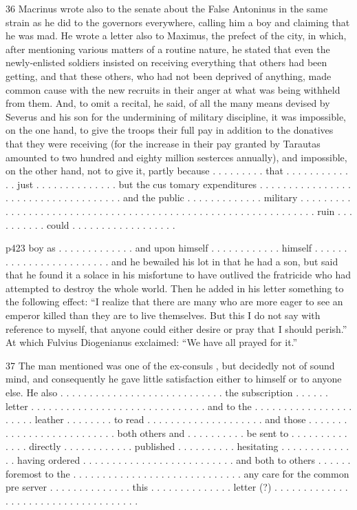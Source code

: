 36
Macrinus wrote also to the senate about the False Antoninus in the same strain as he did to the governors everywhere, calling him a boy and claiming that he was mad. He wrote a letter also to Maximus, the prefect of the city, in which, after mentioning various matters of a routine nature, he stated that even the newly-enlisted soldiers insisted on receiving everything that others had been getting, and that these others, who had not been deprived of anything, made common cause with the new recruits in their anger at what was being withheld from them. And, to omit a recital, he said, of all the many means devised by Severus and his son for the undermining of military discipline, it was impossible, on the one hand, to give the troops their full pay in addition to the donatives that they were receiving (for the increase in their pay granted by Tarautas amounted to two hundred and eighty million sesterces annually), and impossible, on the other hand, not to give it, partly because . . . . . . . . . that . . . . . . . . . . . . . just . . . . . . . . . . . . . . but the cus tomary expenditures . . . . . . . . . . . . . . . . . . . . . . . . . . . . . . . . . . . . and the public . . . . . . . . . . . . . military . . . . . . . . . . . . . . . . . . . . . . . . . . . . . . . . . . . . . . . . . . . . . . . . . . . . . . . . . . . . . . ruin . . . . . . . . . . could . . . . . . . . . . . . . . . . . .

p423 boy as . . . . . . . . . . . . . and upon himself . . . . . . . . . . . . himself . . . . . . . . . . . . . . . . . . . . . . . . and he bewailed his lot in that he had a son, but said that he found it a solace in his misfortune to have outlived the fratricide who had attempted to destroy the whole world. Then he added in his letter something to the following effect: ``I realize that there are many who are more eager to see an emperor killed than they are to live themselves. But this I do not say with reference to myself, that anyone could either desire or pray that I should perish.'' At which Fulvius Diogenianus exclaimed: ``We have all prayed for it.''

37
The man mentioned was one of the ex-consuls , but decidedly not of sound mind, and consequently he gave little satisfaction either to himself or to anyone else. He also . . . . . . . . . . . . . . . . . . . . . . . . . . . . the subscription . . . . . . letter . . . . . . . . . . . . . . . . . . . . . . . . . . . . . . and to the . . . . . . . . . . . . . . . . . . . . . . leather . . . . . . . . to read . . . . . . . . . . . . . . . . . . . . and those . . . . . . . . . . . . . . . . . . . . . . . . . . both others and . . . . . . . . . . be sent to . . . . . . . . . . . . . . directly . . . . . . . . . . . . published . . . . . . . . . . hesitating . . . . . . . . . . . . . . having ordered . . . . . . . . . . . . . . . . . . . . . . . . . . and both to others . . . . . . foremost to the . . . . . . . . . . . . . . . . . . . . . . . . . . . . . any care for the common pre server . . . . . . . . . . . . . . this . . . . . . . . . . . . . . letter (?) . . . . . . . . . . . . . . . . . . . . . . . . . . . . . . . . . . . .

